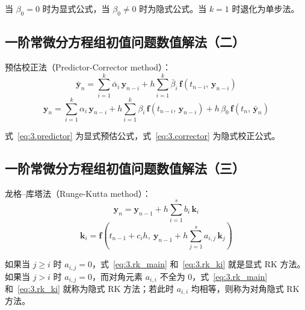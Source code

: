 当 $\beta_0 = 0$ 时为显式公式，当 $\beta_0 \neq 0$ 时为隐式公式。当 $k = 1$ 时退化为单步法。


\subsection{一阶常微分方程组初值问题数值解法（二）}

预估校正法（Predictor-Corrector method）：
\begin{equation}\label{eq:3.predictor}
\bar{\boldsymbol{y}}_n = \sum_{i=1}^{k} \bar{\alpha}_i\, \boldsymbol{y}_{n-i} + h \sum_{i=1}^{k} \bar{\beta}_i\, \boldsymbol{f}(t_{n-i},\, \boldsymbol{y}_{n-i}) \tag{I}
\end{equation}
\begin{equation}\label{eq:3.corrector}
\boldsymbol{y}_n = \sum_{i=1}^{k} \alpha_i\, \boldsymbol{y}_{n-i} + h \sum_{i=1}^{k} \beta_i\, \boldsymbol{f}(t_{n-i},\, \boldsymbol{y}_{n-i}) + h\, \beta_0\, \boldsymbol{f}(t_n,\, \bar{\boldsymbol{y}}_n) \tag{II}
\end{equation}

式~\eqref{eq:3.predictor} 为显式预估公式，式~\eqref{eq:3.corrector} 为隐式校正公式。


\subsection{一阶常微分方程组初值问题数值解法（三）}

龙格--库塔法（Runge-Kutta method）：
\begin{equation}\label{eq:3.rk_main}
\boldsymbol{y}_n = \boldsymbol{y}_{n-1} + h \sum_{i=1}^{s} b_i\, \boldsymbol{k}_i \tag{I}
\end{equation}
\begin{equation}\label{eq:3.rk_ki}
\boldsymbol{k}_i = \boldsymbol{f}\!\left(t_{n-1} + c_i h,\ \boldsymbol{y}_{n-1} + h \sum_{j=1}^{s} a_{i,j}\, \boldsymbol{k}_j\right) \tag{II}
\end{equation}

如果当 $j \geq i$ 时 $a_{i,j} = 0$，式~\eqref{eq:3.rk_main} 和~\eqref{eq:3.rk_ki} 就是显式 RK 方法。如果当 $j > i$ 时 $a_{i,j} = 0$，而对角元素 $a_{i,i}$ 不全为 $0$，式~\eqref{eq:3.rk_main} 和~\eqref{eq:3.rk_ki} 就称为隐式 RK 方法；若此时 $a_{i,i}$ 均相等，则称为对角隐式 RK 方法。

